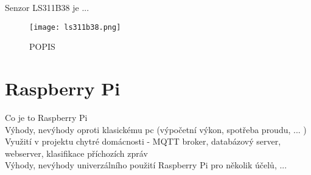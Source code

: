 Senzor LS311B38 je ...

\begin{figure}[H]
  \centering
  \texttt{[image: ls311b38.png]}
  \caption{POPIS}
  \label{fig:hardware_components:LABEL}
\end{figure}

\section{Raspberry Pi} \label{sec:example_xor}

Co je to Raspberry Pi \\
Výhody, nevýhody oproti klasickému pc (výpočetní výkon, spotřeba proudu, ... ) \\
Využití v projektu chytré domácnosti - MQTT broker, databázový server, webserver, klasifikace příchozích zpráv \\
Výhody, nevýhody univerzálního použití Raspberry Pi pro několik účelů, ... \\